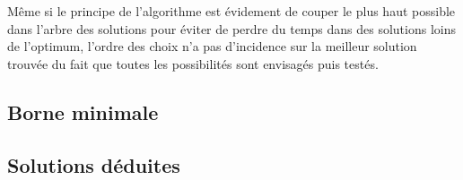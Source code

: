 \documentclass[a4paper, 12pt]{report}
\begin{document}
Même si le principe de l'algorithme est évidement de couper le plus haut possible dans l'arbre des solutions 
pour éviter de perdre du temps dans des solutions loins de l'optimum, 
l'ordre des choix n'a pas d'incidence sur la meilleur solution trouvée 
du fait que toutes les possibilités sont envisagés puis testés. 

\subsection{Borne minimale}


\subsection{Solutions déduites}
\end{document}
